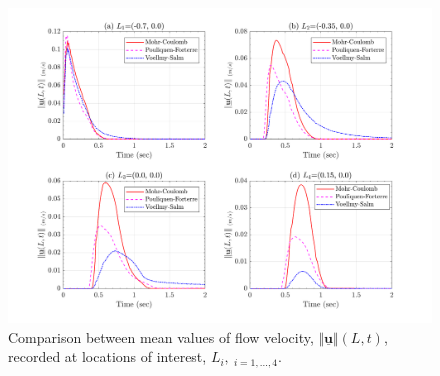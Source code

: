 \documentclass{article}
\begin{document}
\begin{figure}[H]
        \centering
        \includegraphics[width=1\textwidth]{InclinedPlane/LocalRecords/Records/Vel_mean.png}
        \caption{Comparison between mean values of flow velocity, $\Vert \underline{\mathbf{u}} \Vert(L,t)$, recorded at locations of interest, $L_i, \ _{i=1,...,4}$.}
        \label{fig:Ramp-LM-Vel-means}
\end{figure}
\end{document}
